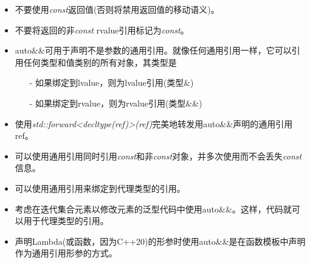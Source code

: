 \begin{itemize}
	\item 不要使用\textit{const}返回值(否则将禁用返回值的移动语义)。
	\item 不要将返回的非\textit{const} rvalue引用标记为\textit{const}。
	\item auto\&\&可用于声明不是参数的通用引用。就像任何通用引用一样，它可以引用任何类型和值类别的所有对象，其类型是
	\begin{itemize}
		\item[-] 如果绑定到lvalue，则为lvalue引用(类型\&)
		\item[-] 如果绑定到rvalue，则为rvalue引用(类型\&\&)
	\end{itemize}
	\item 使用\textit{std::forward<decltype(ref)>(ref)}完美地转发用auto\&\&声明的通用引用ref。
	\item 可以使用通用引用同时引用\textit{const}和非\textit{const}对象，并多次使用而不会丢失\textit{const}信息。
	\item 可以使用通用引用来绑定到代理类型的引用。
	\item 考虑在迭代集合元素以修改元素的泛型代码中使用auto\&\&。这样，代码就可以用于代理类型的引用。
	\item 声明Lambda(或函数，因为C++20)的形参时使用auto\&\&是在函数模板中声明作为通用引用形参的方式。
\end{itemize}


